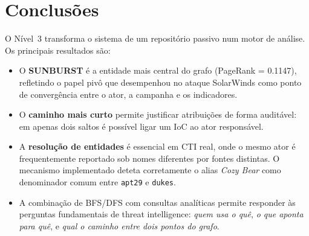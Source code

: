 \documentclass[12pt,a4paper]{article}
\begin{document}
\section{Conclusões}

O Nível~3 transforma o sistema de um repositório passivo num motor de análise. Os principais resultados são:

\begin{itemize}
  \item O \textbf{SUNBURST} é a entidade mais central do grafo (PageRank = 0.1147), refletindo o papel pivô que desempenhou no ataque SolarWinds como ponto de convergência entre o ator, a campanha e os indicadores.

  \item O \textbf{caminho mais curto} permite justificar atribuições de forma auditável: em apenas dois saltos é possível ligar um IoC ao ator responsável.

  \item A \textbf{resolução de entidades} é essencial em CTI real, onde o mesmo ator é frequentemente reportado sob nomes diferentes por fontes distintas. O mecanismo implementado deteta corretamente o alias \emph{Cozy Bear} como denominador comum entre \texttt{apt29} e \texttt{dukes}.

  \item A combinação de BFS/DFS com consultas analíticas permite responder às perguntas fundamentais de threat intelligence: \emph{quem usa o quê}, \emph{o que aponta para quê}, e \emph{qual o caminho entre dois pontos do grafo}.
\end{itemize}
\end{document}
